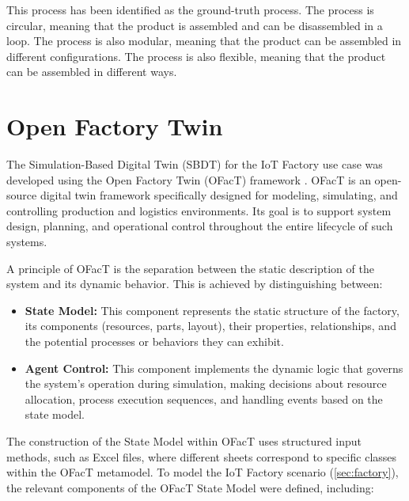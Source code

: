 This process has been identified as the ground-truth process. The process is circular, meaning that the product is assembled and can be disassembled in a loop. The process is also modular, meaning that the product can be assembled in different configurations. The process is also flexible, meaning that the product can be assembled in different ways.

\section{Open Factory Twin}
\label{sec:automated_digital_twin}

The Simulation-Based Digital Twin (SBDT) for the IoT Factory use case was developed using the Open Factory Twin (OFacT) framework \autocite{ofactintern}. OFacT is an open-source digital twin framework specifically designed for modeling, simulating, and controlling production and logistics environments. Its goal is to support system design, planning, and operational control throughout the entire lifecycle of such systems.

A principle of OFacT is the separation between the static description of the system and its dynamic behavior. This is achieved by distinguishing between:

\begin{itemize}
  \item \textbf{State Model:} This component represents the static structure of the factory, its components (resources, parts, layout), their properties, relationships, and the potential processes or behaviors they can exhibit.
  \item \textbf{Agent Control:} This component implements the dynamic logic that governs the system's operation during simulation, making decisions about resource allocation, process execution sequences, and handling events based on the state model.
\end{itemize}

The construction of the State Model within OFacT uses structured input methods, such as Excel files, where different sheets correspond to specific classes within the OFacT metamodel. To model the IoT Factory scenario (\autoref{sec:factory}), the relevant components of the OFacT State Model were defined, including:

